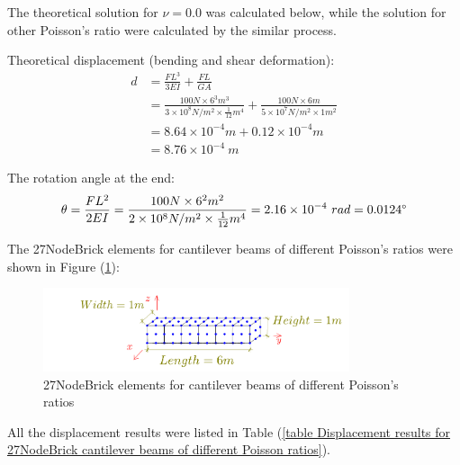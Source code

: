 \documentclass[fleqn,11pt,letter]{article}
\begin{document}
The theoretical solution for $\nu=0.0$ was calculated below, while the solution for other Poisson's ratio were calculated by the similar process. 

Theoretical displacement (bending and shear deformation):
\begin{equation}
  \begin{aligned}
  d &=\frac{FL^3}{3EI}+\frac{FL}{GA} \\ 
    &= \frac{100 N \times 6^3 m^3}{3\times 10^8 N/m^2 \times \frac{1}{12} m^4}+ 
    \frac{100 N\times 6 m}{5\times 10^7 N/m^2\times 1 m^2} \\ 
    &=8.64\times 10^{-4} m + 0.12 \times 10^{-4} m  \\
   & =8.76\times 10^{-4} \ m
   \end{aligned}
\end{equation}

The rotation angle at the end:
\begin{equation}
  \theta =\frac{FL^2}{2EI} 
   =\frac{100 N \times 6^2 m^2} {2\times 10^8 N/m^2 \times \frac{1}{12} m^4} 
 =2.16 \times 10^{-4} \ rad = 0.0124 \degree 
\end{equation}

The 27NodeBrick elements for cantilever beams of different Poisson's ratios were shown in Figure (\ref{fig 27NodeBrick elements for cantilever beams of different Poisson's ratios}):
\begin{figure}[H]
  \centering
  \includegraphics[width=9cm]{../Figure_files/27NodeBrick/beam_27brick_6div.pdf}
  \caption{27NodeBrick elements for cantilever beams of different Poisson's ratios}
  \label{fig 27NodeBrick elements for cantilever beams of different Poisson's ratios}
\end{figure}


All the displacement results were listed in Table (\ref{table Displacement results for 27NodeBrick cantilever beams of different Poisson ratios}). 
\end{document}
